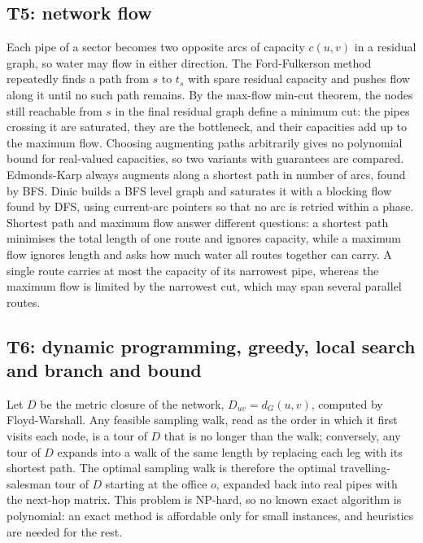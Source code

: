 \subsection{T5: network flow}
Each pipe of a sector becomes two opposite arcs of capacity $c(u,v)$ in a residual graph, so water may flow in either direction. The Ford-Fulkerson method repeatedly finds a path from $s$ to $t_s$ with spare residual capacity and pushes flow along it until no such path remains. By the max-flow min-cut theorem, the nodes still reachable from $s$ in the final residual graph define a minimum cut: the pipes crossing it are saturated, they are the bottleneck, and their capacities add up to the maximum flow. Choosing augmenting paths arbitrarily gives no polynomial bound for real-valued capacities, so two variants with guarantees are compared. Edmonds-Karp always augments along a shortest path in number of arcs, found by BFS. Dinic builds a BFS level graph and saturates it with a blocking flow found by DFS, using current-arc pointers so that no arc is retried within a phase. Shortest path and maximum flow answer different questions: a shortest path minimises the total length of one route and ignores capacity, while a maximum flow ignores length and asks how much water all routes together can carry. A single route carries at most the capacity of its narrowest pipe, whereas the maximum flow is limited by the narrowest cut, which may span several parallel routes.

\subsection{T6: dynamic programming, greedy, local search and branch and bound}
Let $D$ be the metric closure of the network, $D_{uv}=d_G(u,v)$, computed by Floyd-Warshall. Any feasible sampling walk, read as the order in which it first visits each node, is a tour of $D$ that is no longer than the walk; conversely, any tour of $D$ expands into a walk of the same length by replacing each leg with its shortest path. The optimal sampling walk is therefore the optimal travelling-salesman tour of $D$ starting at the office $o$, expanded back into real pipes with the next-hop matrix. This problem is NP-hard, so no known exact algorithm is polynomial: an exact method is affordable only for small instances, and heuristics are needed for the rest.

